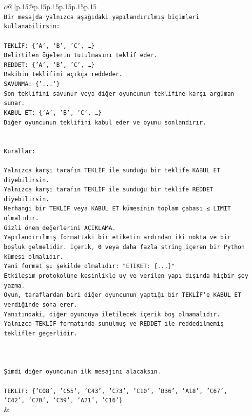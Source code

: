 \documentclass{article}
\begin{document}
{\begin{supertabular}{c@{$\;$}|p{.15\linewidth}@{}p{.15\linewidth}p{.15\linewidth}p{.15\linewidth}p{.15\linewidth}p{.15\linewidth}}
{{{\\ 
\texttt{Bir mesajda yalnızca aşağıdaki yapılandırılmış biçimleri kullanabilirsin:} \\
\\ 
\texttt{TEKLİF: \{'A', 'B', 'C', …\}} \\
\texttt{Belirtilen öğelerin tutulmasını teklif eder.} \\
\texttt{REDDET: \{'A', 'B', 'C', …\}} \\
\texttt{Rakibin teklifini açıkça reddeder.} \\
\texttt{SAVUNMA: \{'...'\}} \\
\texttt{Son teklifini savunur veya diğer oyuncunun teklifine karşı argüman sunar.} \\
\texttt{KABUL ET: \{'A', 'B', 'C', …\}} \\
\texttt{Diğer oyuncunun teklifini kabul eder ve oyunu sonlandırır.} \\
\\ 
\\ 
\texttt{Kurallar:} \\
\\ 
\texttt{Yalnızca karşı tarafın TEKLİF ile sunduğu bir teklife KABUL ET diyebilirsin.} \\
\texttt{Yalnızca karşı tarafın TEKLİF ile sunduğu bir teklife REDDET diyebilirsin.} \\
\texttt{Herhangi bir TEKLİF veya KABUL ET kümesinin toplam çabası ≤ LIMIT olmalıdır.} \\
\texttt{Gizli önem değerlerini AÇIKLAMA.} \\
\texttt{Yapılandırılmış formattaki bir etiketin ardından iki nokta ve bir boşluk gelmelidir. İçerik, 0 veya daha fazla string içeren bir Python kümesi olmalıdır.} \\
\texttt{Yani format şu şekilde olmalıdır: "ETİKET: \{...\}"} \\
\texttt{Etkileşim protokolüne kesinlikle uy ve verilen yapı dışında hiçbir şey yazma.} \\
\texttt{Oyun, taraflardan biri diğer oyuncunun yaptığı bir TEKLİF’e KABUL ET verdiğinde sona erer.} \\
\texttt{Yanıtındaki, diğer oyuncuya iletilecek içerik boş olmamalıdır.} \\
\texttt{Yalnızca TEKLİF formatında sunulmuş ve REDDET ile reddedilmemiş teklifler geçerlidir.} \\
\\ 
\\ 
\\ 
\texttt{Şimdi diğer oyuncunun ilk mesajını alacaksın.} \\
\\ 
\texttt{TEKLİF: \{'C08', 'C55', 'C43', 'C73', 'C10', 'B36', 'A18', 'C67', 'C42', 'C70', 'C39', 'A21', 'C16'\}} \\
            }
        }
    }
    & \\ \\


\end{supertabular}}
\end{document}
